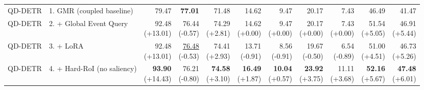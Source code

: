 \documentclass{article}
\begin{document}
{\begin{tabular}{llrrrrrrrrr}
\midrule
QD-DETR & 1. GMR (coupled baseline) & 79.47 & \textbf{77.01} & 71.48 & 14.62 & 9.47 & 20.17 & 7.43 & 46.49 & 41.47 \\
QD-DETR & 2. + Global Event Query & \shortstack{92.48 \\ {\scriptsize (+13.01)}} & \shortstack{76.44 \\ {\scriptsize (-0.57)}} & \shortstack{74.29 \\ {\scriptsize (+2.81)}} & \shortstack{14.62 \\ {\scriptsize (+0.00)}} & \shortstack{9.47 \\ {\scriptsize (+0.00)}} & \shortstack{20.17 \\ {\scriptsize (+0.00)}} & \shortstack{7.43 \\ {\scriptsize (+0.00)}} & \shortstack{51.54 \\ {\scriptsize (+5.05)}} & \shortstack{46.91 \\ {\scriptsize (+5.44)}} \\
QD-DETR & 3. + LoRA & \shortstack{92.48 \\ {\scriptsize (+13.01)}} & \shortstack{\underline{76.48} \\ {\scriptsize (-0.53)}} & \shortstack{74.41 \\ {\scriptsize (+2.93)}} & \shortstack{13.71 \\ {\scriptsize (-0.91)}} & \shortstack{8.56 \\ {\scriptsize (-0.91)}} & \shortstack{19.67 \\ {\scriptsize (-0.50)}} & \shortstack{6.54 \\ {\scriptsize (-0.89)}} & \shortstack{51.00 \\ {\scriptsize (+4.51)}} & \shortstack{46.73 \\ {\scriptsize (+5.26)}} \\
QD-DETR & 4. + Hard-RoI (no saliency) & \shortstack{\textbf{93.90} \\ {\scriptsize (+14.43)}} & \shortstack{76.21 \\ {\scriptsize (-0.80)}} & \shortstack{\textbf{74.58} \\ {\scriptsize (+3.10)}} & \shortstack{\textbf{16.49} \\ {\scriptsize (+1.87)}} & \shortstack{\textbf{10.04} \\ {\scriptsize (+0.57)}} & \shortstack{\textbf{23.92} \\ {\scriptsize (+3.75)}} & \shortstack{11.11 \\ {\scriptsize (+3.68)}} & \shortstack{\textbf{52.16} \\ {\scriptsize (+5.67)}} & \shortstack{\textbf{47.48} \\ {\scriptsize (+6.01)}} \\

\end{tabular}}
\end{document}
